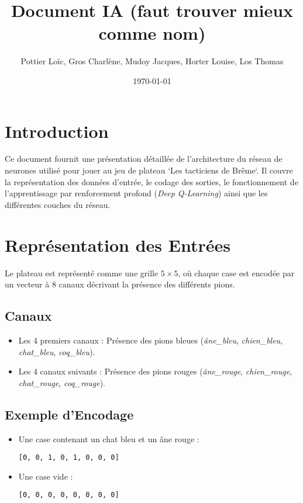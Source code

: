 \documentclass[]{article}
\title{\textbf{Document IA (faut trouver mieux comme nom)}} %
\author{Pottier Loïc, Gros Charlène, Mudoy Jacques, Horter Louise, Los Thomas}
\date{\today}
\begin{document}
\maketitle

\section{Introduction}
Ce document fournit une présentation détaillée de l'architecture du réseau de neurones utilisé pour jouer au jeu de plateau `Les tacticiens de Brême`. Il couvre la représentation des données d'entrée, le codage des sorties, le fonctionnement de l'apprentissage par renforcement profond (\textit{Deep Q-Learning}) ainsi que les différentes couches du réseau.


\section{Représentation des Entrées}
Le plateau est représenté comme une grille \(5 \times 5\), où chaque case est encodée par un vecteur à 8 canaux décrivant la présence des différents pions.

\subsection{Canaux}
\begin{itemize}
    \item Les 4 premiers canaux : Présence des pions bleues (\textit{âne\_bleu}, \textit{chien\_bleu}, \textit{chat\_bleu}, \textit{coq\_bleu}).
    \item Les 4 canaux suivants : Présence des pions rouges (\textit{âne\_rouge}, \textit{chien\_rouge}, \textit{chat\_rouge}, \textit{coq\_rouge}).
\end{itemize}

\subsection{Exemple d'Encodage}
\begin{itemize}
    \item Une case contenant un chat bleu et un âne rouge :
    \begin{verbatim}
[0, 0, 1, 0, 1, 0, 0, 0]
    \end{verbatim}
    \item Une case vide :
    \begin{verbatim}
[0, 0, 0, 0, 0, 0, 0, 0]
    \end{verbatim}
\end{itemize}
\end{document}
